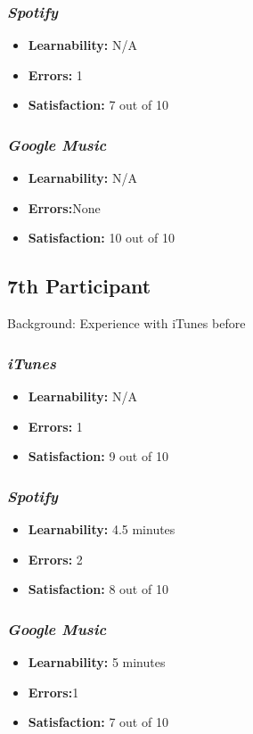 \documentclass{article}
\begin{document}
{\begin{multicols}{2}
\subsubsection{\it Spotify}
\begin{itemize}
	\item {\bf Learnability:} N/A
	\item {\bf Errors:} 1
	\item {\bf Satisfaction:} 7 out of 10 
\end{itemize}

\subsubsection{\it Google Music}
\begin{itemize}
\item {\bf Learnability:} N/A
	\item {\bf Errors:}None
	\item {\bf Satisfaction:} 10 out of 10 
\end{itemize}  
\subsection{7th Participant}
Background: Experience with iTunes before

\subsubsection{\it iTunes}
\begin{itemize}
	\item {\bf Learnability:} N/A
	\item {\bf Errors:} 1
	\item {\bf Satisfaction:} 9 out of 10 
\end{itemize}

\subsubsection{\it Spotify}
\begin{itemize}
	\item {\bf Learnability:} 4.5 minutes
	\item {\bf Errors:} 2
	\item {\bf Satisfaction:} 8 out of 10 
\end{itemize}

\subsubsection{\it Google Music}
\begin{itemize}
\item {\bf Learnability:} 5 minutes
	\item {\bf Errors:}1
	\item {\bf Satisfaction:} 7 out of 10 
\end{itemize} 


\end{multicols}}
\end{document}

